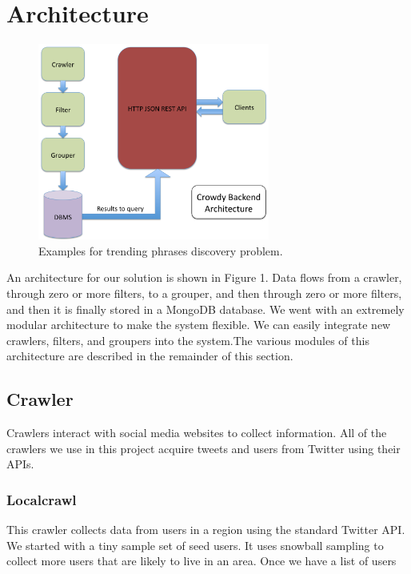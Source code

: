 \documentclass{sig-alternate}
\begin{document}
\section{Architecture}
\label{sec:architecture}
\begin{figure}[!t]
\begin{center}
\includegraphics[width=3.0in]{images/architecture}
\caption{Examples for trending phrases discovery problem.}
\label{fig:candidate_phrases}
\end{center}
\end{figure}

An architecture for our solution is shown in Figure 1.  Data flows from a
crawler, through zero or more filters, to a grouper, and then through zero or
more filters, and then it is finally stored in a MongoDB database.  We went
with an extremely modular architecture to make the system flexible.  We can
easily integrate new crawlers, filters, and groupers into the system.The
various modules of this architecture are described in the remainder of this
section.

\subsection{Crawler}
Crawlers interact with social media websites to collect information. All of the
crawlers we use in this project acquire tweets and users from Twitter using
their APIs.

\subsubsection{Localcrawl}
This crawler collects data from users
in a region using the standard Twitter API. We started with a tiny sample set
of seed users. It uses snowball sampling to collect more users that are likely
to live in an area. Once we have a list of users 
\end{document}
